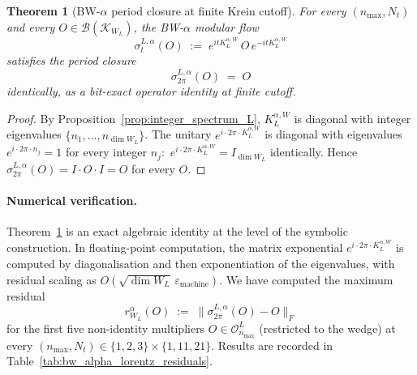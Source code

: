 \documentclass[11pt,a4paper]{article}
\theoremstyle{plain}
\newtheorem{theorem}{Theorem}[section]
\theoremstyle{definition}
\newcommand{\nmax}{n_{\max}}
\newcommand{\Nt}{N_t}
\newcommand{\Krein}{\mathcal{K}}
\newcommand{\Op}{\mathcal{O}}
\newcommand{\Bcal}{\mathcal{B}}
\newcommand{\Frob}[1]{\lVert #1 \rVert_{F}}
\newcommand{\KL}{K_{L}}
\begin{document}
\begin{theorem}[BW-$\alpha$ period closure at finite Krein cutoff]
\label{thm:bw_alpha_lorentz}
For every $(\nmax, \Nt)$ and every $O \in \Bcal(\Krein_{W_L})$, the
BW-$\alpha$ modular flow
\begin{equation}\label{eq:bw_alpha_flow}
   \sigma_t^{L, \alpha}(O)
   \;:=\; e^{i t \KL^{\alpha, W}}\, O\, e^{-i t \KL^{\alpha, W}}
\end{equation}
satisfies the period closure
\begin{equation}\label{eq:bw_alpha_closure_lorentz}
   \sigma_{2\pi}^{L, \alpha}(O) \;=\; O
\end{equation}
identically, as a bit-exact operator identity at finite cutoff.
\end{theorem}

\begin{proof}
By Proposition~\ref{prop:integer_spectrum_L}, $\KL^{\alpha, W}$ is
diagonal with integer eigenvalues $\{n_1, \ldots, n_{\dim W_L}\}$. The
unitary $e^{i \cdot 2\pi \cdot \KL^{\alpha, W}}$ is diagonal with
eigenvalues $e^{i \cdot 2\pi \cdot n_j} = 1$ for every integer $n_j$:\
$e^{i \cdot 2\pi \cdot \KL^{\alpha, W}} = I_{\dim W_L}$ identically.
Hence $\sigma_{2\pi}^{L, \alpha}(O) = I \cdot O \cdot I = O$ for every
$O$.
\end{proof}

\paragraph{Numerical verification.}
Theorem~\ref{thm:bw_alpha_lorentz} is an exact algebraic identity at
the level of the symbolic construction. In floating-point computation,
the matrix exponential $e^{i \cdot 2\pi \cdot \KL^{\alpha, W}}$ is
computed by diagonalisation and then exponentiation of the
eigenvalues, with residual scaling as $O(\sqrt{\dim W_L}\,
\varepsilon_{\mathrm{machine}})$. We have computed the maximum
residual
\begin{equation}\label{eq:r_L_alpha}
   r_{W_L}^\alpha(O)
   \;:=\; \Frob{\sigma_{2\pi}^{L, \alpha}(O) - O}
\end{equation}
for the first five non-identity multipliers $O \in \Op_{\nmax}^L$
(restricted to the wedge) at every $(\nmax, \Nt) \in \{1, 2, 3\}
\times \{1, 11, 21\}$. Results are recorded in
Table~\ref{tab:bw_alpha_lorentz_residuals}.
\end{document}
